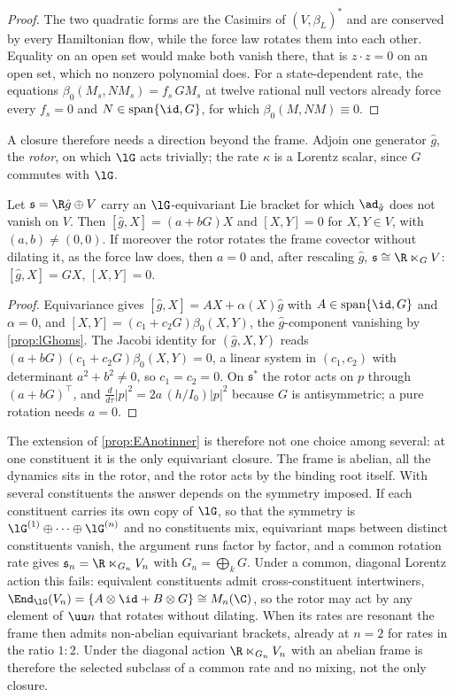 \begin{proof}
The two quadratic forms are the Casimirs of $(V,\beta_L)^*$ and are conserved by every Hamiltonian flow, while the force law rotates them into
each other. Equality on an open set would make both vanish there, that is $z\cdot z=0$ on an open set, which no nonzero polynomial does. For a
state-dependent rate, the equations $\beta_0(M_s,NM_s)=f_s\,GM_s$ at twelve rational null vectors already force every $f_s=0$ and
$N\in\operatorname{span}\{\id,G\}$, for which $\beta_0(M,NM)\equiv0$.
\end{proof}

A closure therefore needs a direction beyond the frame. Adjoin one generator $\hat g$, the \emph{rotor}, on which $\lG$ acts trivially; the rate
$\kappa$ is a Lorentz scalar, since $G$ commutes with $\lG$.

\begin{theorem}
\label{thm:closureunique}
Let $\mathfrak s=\R\hat g\oplus V$ carry an $\lG$-equivariant Lie bracket for which $\ad_{\hat g}$ does not vanish on $V$. Then
$[\hat g,X]=(a+bG)X$ and $[X,Y]=0$ for $X,Y\in V$, with $(a,b)\neq(0,0)$. If moreover the rotor rotates the frame covector without dilating it,
as the force law does, then $a=0$ and, after rescaling $\hat g$, $\mathfrak s\cong\R\ltimes_GV$: $[\hat g,X]=GX$, $[X,Y]=0$.
\end{theorem}

\begin{proof}
Equivariance gives $[\hat g,X]=AX+\alpha(X)\hat g$ with $A\in\operatorname{span}\{\id,G\}$ and $\alpha=0$, and $[X,Y]=(c_1+c_2G)\beta_0(X,Y)$, the
$\hat g$-component vanishing by \cref{prop:lGhoms}. The Jacobi identity for $(\hat g,X,Y)$ reads $(a+bG)(c_1+c_2G)\beta_0(X,Y)=0$, a linear system in
$(c_1,c_2)$ with determinant $a^2+b^2\neq0$, so $c_1=c_2=0$. On $\mathfrak s^*$ the rotor acts on $p$ through $(a+bG)^{\!\top}$, and
$\tfrac{d}{d\tau}|p|^2=2a\,(h/I_0)|p|^2$ because $G$ is antisymmetric; a pure rotation needs $a=0$.
\end{proof}

The extension of \cref{prop:EAnotinner} is therefore not one choice among several: at one constituent it is the only equivariant closure. The
frame is abelian, all the dynamics sits in the rotor, and the rotor acts by the binding root itself. With several constituents the answer depends on
the symmetry imposed. If each constituent carries its own copy of $\lG$, so that the symmetry is $\lG^{(1)}\oplus\cdots\oplus\lG^{(n)}$ and no
constituents mix, equivariant maps between distinct constituents vanish, the argument runs factor by factor, and a common rotation rate gives
$\mathfrak s_n=\R\ltimes_{G_n}V_n$ with $G_n=\bigoplus_kG$. Under a common, diagonal Lorentz action this fails: equivalent constituents admit
cross-constituent intertwiners, $\End_{\lG}(V_n)=\{A\otimes\id+B\otimes G\}\cong M_n(\C)$, so the rotor may act by any element of $\uu n$ that
rotates without dilating. When its rates are resonant the frame then admits non-abelian equivariant brackets, already at $n=2$ for rates in the
ratio $1:2$. Under the diagonal action $\R\ltimes_{G_n}V_n$ with an abelian frame is therefore the selected subclass of a common rate and no
mixing, not the only closure.


